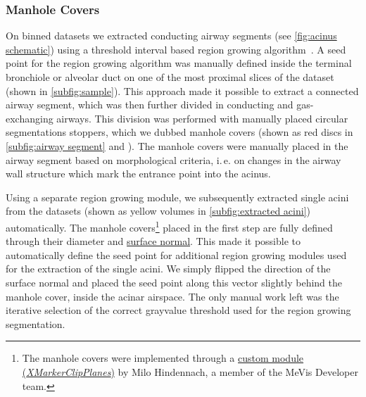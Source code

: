 \documentclass[%
	draft=true,
	paper=a4,%
	twoside=true,%
	abstract=true]{scrartcl}
\newcommand{\ie}{i.\,e.\xspace}
\begin{document}
\subsubsection{Manhole Covers}\label{sec:manhole covers}
On binned datasets we extracted conducting airway segments (see \autoref{fig:acinus schematic}) using a threshold interval based region growing algorithm~\cite{Zucker1976}. A seed point for the region growing algorithm was manually defined inside the terminal bronchiole or alveolar duct on one of the most proximal slices of the dataset (shown in \autoref{subfig:sample}). This approach made it possible to extract a connected airway segment, which was then further divided in conducting and gas-exchanging airways. This division was performed with manually placed circular segmentations stoppers, which we dubbed manhole covers (shown as red discs in \autoref{subfig:airway segment} and ). The manhole covers were manually placed in the airway segment based on morphological criteria, \ie on changes in the airway wall structure which mark the entrance point into the acinus.

\begin{figure}
\end{figure}

Using a separate region growing module, we subsequently extracted single acini from the datasets (shown as yellow volumes in \autoref{subfig:extracted acini}) automatically. The manhole covers\footnote{The manhole covers were implemented through a \href{http://www.mevis-research.de/cgi-bin/discus/board-auth.cgi?lm=1282233250&file=/839/11760.html}{custom module (\emph{XMarkerClipPlanes})} by Milo Hindennach, a member of the MeVis Developer team.} placed in the first step are fully defined through their diameter and \href{https://secure.wikimedia.org/wikipedia/en/w/index.php?title=Surface_normal&oldid=411684319}{surface normal}. This made it possible to automatically define the seed point for additional region growing modules used for the extraction of the single acini. We simply flipped the direction of the surface normal and placed the seed point along this vector slightly behind the manhole cover, inside the acinar airspace. The only manual work left was the iterative selection of the correct grayvalue threshold used for the region growing segmentation.
\end{document}
